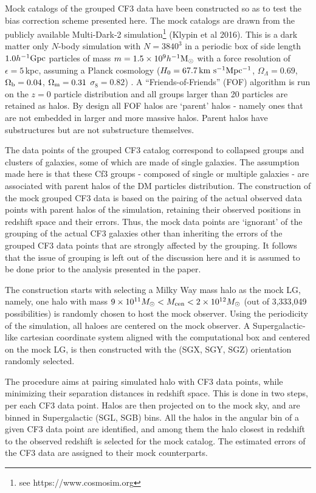 \documentclass[useAMS,usenatbib]{mn2e}
\newcommand{\kmsMpc}{{\,\rm km \ s^{-1}Mpc^{-1}}}
\newcommand{\hgpc}{{\ifmmode{h^{-1}{\rm Gpc}}\else{$h^{-1}$Gpc}\fi}}
\newcommand{\hmsun}{{\ifmmode{h^{-1}{\rm {M_{\odot}}}}\else{$h^{-1}{\rm{M_{\odot}}}$}\fi}}
\begin{document}
Mock catalogs of the grouped CF3 data have been constructed so as to test the bias correction scheme  presented here.  The mock catalogs are drawn from  the publicly available Multi-Dark-2 simulation\footnote{see https://www.cosmosim.org} (Klypin et al 2016).  %
    This is a dark matter only $N$-body simulation  with $N=3840^3$ in a periodic box of side length  $1.0 \hgpc$ particles of mass $m=1.5\times 10^{9}\hmsun$ with a force resolution of $\epsilon=5$\,kpc,  assuming a Planck cosmology ($H_0=67.7\kmsMpc$, $\Omega_{\Lambda}=0.69$, $\Omega_{\rm b}=0.04$, $\Omega_{\rm m}=0.31$ $\sigma_{8}=0.82$)  \citep{Planck:2013}.
 A ``Friends-of-Friends''  (FOF) algorithm is run on the $z=0$ particle distribution and all groups larger than 20 particles are retained as halos.
 By design all FOF halos are `parent' halos - namely ones that are not embedded in larger and more massive halos. Parent halos have substructures but are not  substructure themselves.


The data points of the grouped CF3 catalog correspond to collapsed groups and clusters of galaxies, some of which are made of single galaxies. The assumption made here is that these Cf3 groups - composed  of single or multiple galaxies -  are associated with parent halos of the DM particles distribution.  The construction of the mock grouped CF3 data  is based on the pairing of the actual observed data points with parent halos of the simulation, retaining their observed positions in redshift space and their errors. Thus, the mock data points are `ignorant' of the grouping of  the actual CF3 galaxies other than inheriting the errors of the grouped CF3 data points that are strongly affected by the grouping.
It follows that the issue of grouping is left out of the discussion  here and it is assumed to be done prior to the analysis presented in the paper.

    
The construction  starts with selecting a Milky Way mass halo as the mock LG, namely, one halo with mass $9\times10^{11}M_{\odot}< M_{\rm cen} <2\times10^{12}M_{\odot}$ (out of 3,333,049 possibilities) is randomly chosen to host the mock observer. Using the periodicity of the simulation, all haloes are centered on the mock observer.  A  Supergalactic-like cartesian coordinate system  aligned with the computational box and centered on the mock LG,  is then constructed with the (SGX, SGY, SGZ) orientation randomly selected.
 
The procedure aims at pairing simulated halo with CF3 data points, while minimizing their separation distances in redshift space.   This is done in two steps, per each CF3 data point. Halos are then projected on to the mock sky, and are binned in Supergalactic  (SGL, SGB) bins. All the halos in the angular bin of a given CF3 data point are identified, and among them the halo closest in redshift to the observed redshift is selected for the mock catalog. The estimated errors of the CF3 data are assigned to their mock counterparts. 
\end{document}
